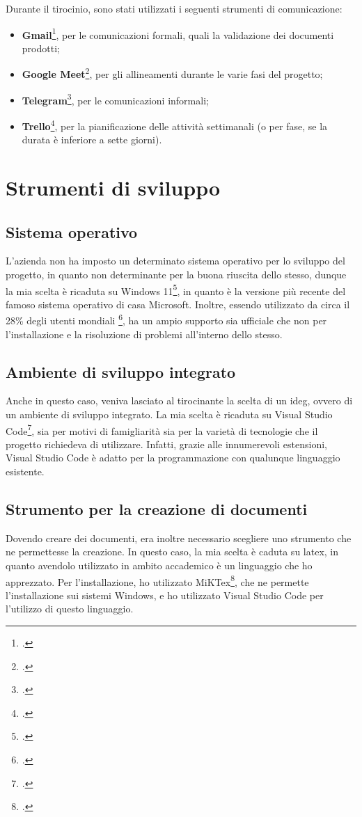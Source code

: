 Durante il tirocinio, sono stati utilizzati i seguenti strumenti di comunicazione:
\begin{itemize}
    \item \textbf{Gmail}\footcite{site:gmail}, per le comunicazioni formali, quali la validazione dei documenti prodotti;
    \item \textbf{Google Meet}\footcite{site:meet}, per gli allineamenti durante le varie fasi del progetto;
    \item \textbf{Telegram}\footcite{site:telegram}, per le comunicazioni informali;
    \item \textbf{Trello}\footcite{site:trello}, per la pianificazione delle attività settimanali (o per fase, se la durata è inferiore a sette giorni).
\end{itemize}

\section{Strumenti di sviluppo}
\label{sec:sviluppoStrum}
\subsection{Sistema operativo}
L'azienda non ha imposto un determinato sistema operativo per lo sviluppo del progetto, in quanto non determinante per la buona riuscita dello stesso, dunque la mia scelta è ricaduta su Windows 11\footcite{site:w11}, in quanto è la versione più recente del famoso sistema operativo di casa Microsoft. Inoltre, essendo utilizzato da circa il 28\% degli utenti mondiali \footcite{site:statOS}, ha un ampio supporto sia ufficiale che non per l'installazione e la risoluzione di problemi all'interno dello stesso.
\subsection{Ambiente di sviluppo integrato}
Anche in questo caso, veniva lasciato al tirocinante la scelta di un \gls{ideg}, ovvero di un ambiente di sviluppo integrato. La mia scelta è ricaduta su Visual Studio Code\footcite{site:vscode}, sia per motivi di famigliarità sia per la varietà di tecnologie che il progetto richiedeva di utilizzare. Infatti, grazie alle innumerevoli estensioni, Visual Studio Code è adatto per la programmazione con qualunque linguaggio esistente.
\subsection{Strumento per la creazione di documenti}
Dovendo creare dei documenti, era inoltre necessario scegliere uno strumento che ne permettesse la creazione. In questo caso, la mia scelta è caduta su \gls{latex}, in quanto avendolo utilizzato in ambito accademico è un linguaggio che ho apprezzato. Per l'installazione, ho utilizzato MiKTex\footcite{site:miktex}, che ne permette l'installazione sui sistemi Windows, e ho utilizzato Visual Studio Code per l'utilizzo di questo linguaggio.

